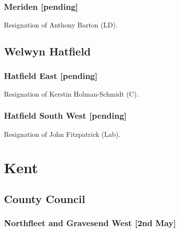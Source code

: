 \documentclass[a4paper,openany]{book}
\begin{document}
\begin{resultsiii}
\subsubsection*{Meriden \hspace*{\fill}\nolinebreak[1]%
	\enspace\hspace*{\fill}
	[pending]}


Resignation of Anthony Barton (LD).

\subsection*{Welwyn Hatfield}

\subsubsection*{Hatfield East \hspace*{\fill}\nolinebreak[1]%
	\enspace\hspace*{\fill}
	[pending]}


Resignation of Kerstin Holman-Schmidt (C).

\subsubsection*{Hatfield South West \hspace*{\fill}\nolinebreak[1]%
	\enspace\hspace*{\fill}
	[pending]}


Resignation of John Fitzpatrick (Lab).

\section{Kent}

\subsection*{County Council}

\subsubsection*{Northfleet and Gravesend West \hspace*{\fill}\nolinebreak[1]%
	\enspace\hspace*{\fill}
	[2nd May]}


\end{resultsiii}
\end{document}
